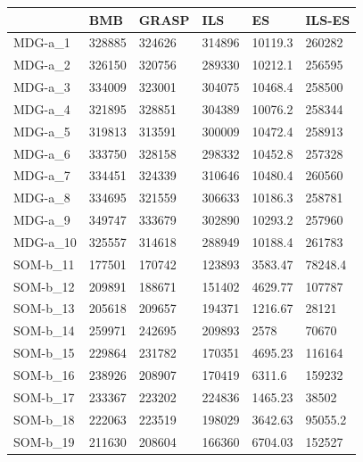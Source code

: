 \documentclass[11pt,a4paper]{article}
\begin{document}
	\begin{table}[H]
		\centering
		\begin{tabular}{l|l|l|l|l|l|}
			\cline{2-6}
			& BMB & GRASP & ILS & ES & ILS-ES \\ \hline
			\multicolumn{1}{|l|}{MDG-a\_1} & 328885 & 324626 & 314896 & 10119.3 & 260282 \\ \hline
			\multicolumn{1}{|l|}{MDG-a\_2} & 326150 & 320756 & 289330 & 10212.1 & 256595 \\ \hline
			\multicolumn{1}{|l|}{MDG-a\_3} & 334009 & 323001 & 304075 & 10468.4 & 258500 \\ \hline
			\multicolumn{1}{|l|}{MDG-a\_4} & 321895 & 328851 & 304389 & 10076.2 & 258344 \\ \hline
			\multicolumn{1}{|l|}{MDG-a\_5} & 319813 & 313591 & 300009 & 10472.4 & 258913 \\ \hline
			\multicolumn{1}{|l|}{MDG-a\_6} & 333750 & 328158 & 298332 & 10452.8 & 257328 \\ \hline
			\multicolumn{1}{|l|}{MDG-a\_7} & 334451 & 324339 & 310646 & 10480.4 & 260560 \\ \hline
			\multicolumn{1}{|l|}{MDG-a\_8} & 334695 & 321559 & 306633 & 10186.3 & 258781 \\ \hline
			\multicolumn{1}{|l|}{MDG-a\_9} & 349747 & 333679 & 302890 & 10293.2 & 257960 \\ \hline
			\multicolumn{1}{|l|}{MDG-a\_10} & 325557 & 314618 & 288949 & 10188.4 & 261783 \\ \hline
			\multicolumn{1}{|l|}{SOM-b\_11} & 177501 & 170742 & 123893 & 3583.47 & 78248.4 \\ \hline
			\multicolumn{1}{|l|}{SOM-b\_12} & 209891 & 188671 & 151402 & 4629.77 & 107787 \\ \hline
			\multicolumn{1}{|l|}{SOM-b\_13} & 205618 & 209657 & 194371 & 1216.67 & 28121 \\ \hline
			\multicolumn{1}{|l|}{SOM-b\_14} & 259971 & 242695 & 209893 & 2578 & 70670 \\ \hline
			\multicolumn{1}{|l|}{SOM-b\_15} & 229864 & 231782 & 170351 & 4695.23 & 116164 \\ \hline
			\multicolumn{1}{|l|}{SOM-b\_16} & 238926 & 208907 & 170419 & 6311.6 & 159232 \\ \hline
			\multicolumn{1}{|l|}{SOM-b\_17} & 233367 & 223202 & 224836 & 1465.23 & 38502 \\ \hline
			\multicolumn{1}{|l|}{SOM-b\_18} & 222063 & 223519 & 198029 & 3642.63 & 95055.2 \\ \hline
			\multicolumn{1}{|l|}{SOM-b\_19} & 211630 & 208604 & 166360 & 6704.03 & 152527 \\ \hline

\end{tabular}
\end{table}
\end{document}
